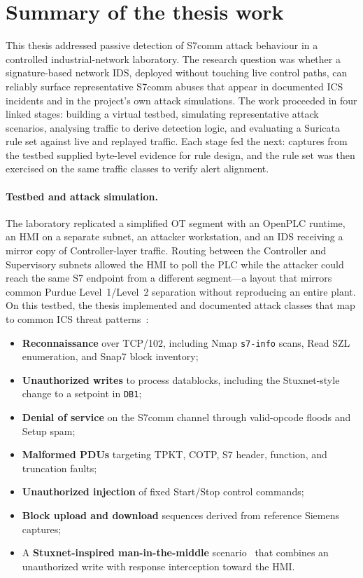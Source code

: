 \documentclass[../main.tex]{subfiles}
\begin{document}
\section{Summary of the thesis work}

This thesis addressed passive detection of S7comm attack behaviour in a controlled industrial-network laboratory. The research question was whether a signature-based network IDS, deployed without touching live control paths, can reliably surface representative S7comm abuses that appear in documented ICS incidents and in the project's own attack simulations. The work proceeded in four linked stages: building a virtual testbed, simulating representative attack scenarios, analysing traffic to derive detection logic, and evaluating a Suricata rule set against live and replayed traffic. Each stage fed the next: captures from the testbed supplied byte-level evidence for rule design, and the rule set was then exercised on the same traffic classes to verify alert alignment.

\paragraph{Testbed and attack simulation.}
The laboratory replicated a simplified OT segment with an OpenPLC runtime, an HMI on a separate subnet, an attacker workstation, and an IDS receiving a mirror copy of Controller-layer traffic. Routing between the Controller and Supervisory subnets allowed the HMI to poll the PLC while the attacker could reach the same S7 endpoint from a different segment---a layout that mirrors common Purdue Level~1/Level~2 separation without reproducing an entire plant. On this testbed, the thesis implemented and documented attack classes that map to common ICS threat patterns~\cite{mitre_ics_attack}:

\begin{itemize}
    \item \textbf{Reconnaissance} over TCP/102, including Nmap \texttt{s7-info} scans, Read SZL enumeration, and Snap7 block inventory;
    \item \textbf{Unauthorized writes} to process datablocks, including the Stuxnet-style change to a setpoint in \texttt{DB1};
    \item \textbf{Denial of service} on the S7comm channel through valid-opcode floods and Setup spam;
    \item \textbf{Malformed PDUs} targeting TPKT, COTP, S7 header, function, and truncation faults;
    \item \textbf{Unauthorized injection} of fixed Start/Stop control commands;
    \item \textbf{Block upload and download} sequences derived from reference Siemens captures;
    \item A \textbf{Stuxnet-inspired man-in-the-middle} scenario~\cite{falliere2010stuxnet,langner2011stuxnet,stuxnet_work_details} that combines an unauthorized write with response interception toward the HMI.
\end{itemize}
\end{document}
